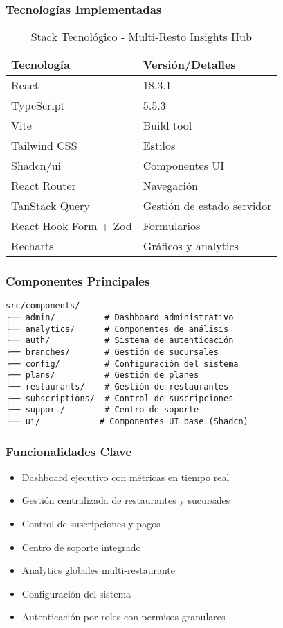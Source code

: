 \documentclass[12pt,a4paper]{article}
\begin{document}
\subsubsection{Tecnologías Implementadas}
\begin{table}[H]
\centering
\begin{tabular}{@{}ll@{}}
\toprule
\textbf{Tecnología} & \textbf{Versión/Detalles} \\
\midrule
React & 18.3.1 \\
TypeScript & 5.5.3 \\
Vite & Build tool \\
Tailwind CSS & Estilos \\
Shadcn/ui & Componentes UI \\
React Router & Navegación \\
TanStack Query & Gestión de estado servidor \\
React Hook Form + Zod & Formularios \\
Recharts & Gráficos y analytics \\
\bottomrule
\end{tabular}
\caption{Stack Tecnológico - Multi-Resto Insights Hub}
\end{table}

\subsubsection{Componentes Principales}
\begin{verbatim}
src/components/
├── admin/          # Dashboard administrativo
├── analytics/      # Componentes de análisis
├── auth/           # Sistema de autenticación
├── branches/       # Gestión de sucursales
├── config/         # Configuración del sistema
├── plans/          # Gestión de planes
├── restaurants/    # Gestión de restaurantes
├── subscriptions/  # Control de suscripciones
├── support/        # Centro de soporte
└── ui/            # Componentes UI base (Shadcn)
\end{verbatim}

\subsubsection{Funcionalidades Clave}
\begin{itemize}
    \item Dashboard ejecutivo con métricas en tiempo real
    \item Gestión centralizada de restaurantes y sucursales
    \item Control de suscripciones y pagos
    \item Centro de soporte integrado
    \item Analytics globales multi-restaurante
    \item Configuración del sistema
    \item Autenticación por roles con permisos granulares
\end{itemize}
\end{document}
